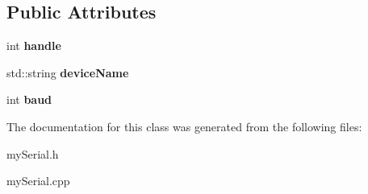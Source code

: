 \subsection*{Public Attributes}
\begin{DoxyCompactItemize}
\item 
\hypertarget{classKinDrv_1_1mySerial_a92989cc09d53f00f5bf220608b216cb8}{int {\bfseries handle}}\label{classKinDrv_1_1mySerial_a92989cc09d53f00f5bf220608b216cb8}

\item 
\hypertarget{classKinDrv_1_1mySerial_a51c22dfc88cf528fdf17d2bceb7a11e9}{std\+::string {\bfseries device\+Name}}\label{classKinDrv_1_1mySerial_a51c22dfc88cf528fdf17d2bceb7a11e9}

\item 
\hypertarget{classKinDrv_1_1mySerial_a2ba702ee279deaa5f171747878417814}{int {\bfseries baud}}\label{classKinDrv_1_1mySerial_a2ba702ee279deaa5f171747878417814}

\end{DoxyCompactItemize}


The documentation for this class was generated from the following files\+:\begin{DoxyCompactItemize}
\item 
my\+Serial.\+h\item 
my\+Serial.\+cpp\end{DoxyCompactItemize}

